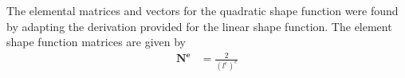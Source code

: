 The elemental matrices and vectors for the quadratic shape function were found
by adapting the derivation provided for the linear shape function. The element
shape function matrices are given by
\begin{align}
    \bm{N^e} &= \frac{2}{(l^e)^e}
\end{align}
